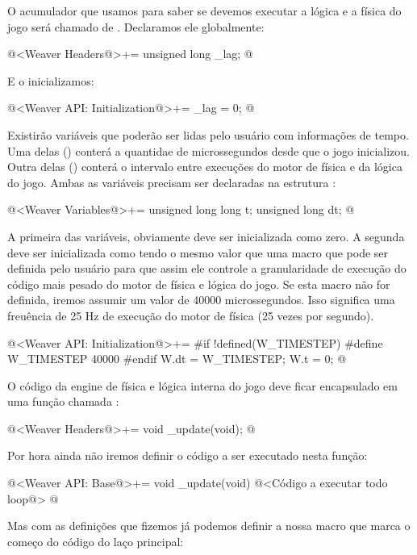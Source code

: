 O acumulador que usamos para saber se devemos executar a lógica e a
física do jogo será chamado de . Declaramos ele
globalmente:

\iniciocodigo
@<Weaver Headers@>+=
unsigned long _lag;
@
\fimcodigo

E o inicializamos:

@<Weaver API: Initialization@>+=
_lag = 0;
@

Existirão variáveis que poderão ser lidas pelo usuário com informações
de tempo. Uma delas () conterá a quantidae de
microssegundos desde que o jogo inicializou. Outra delas
() conterá o intervalo entre execuções do motor de
física e da lógica do jogo. Ambas as variáveis precisam ser declaradas
na estrutura :

\iniciocodigo
@<Weaver Variables@>+=
unsigned long long t;
unsigned long dt;
@
\fimcodigo

A primeira das variáveis, obviamente deve ser inicializada como
zero. A segunda deve ser inicializada como tendo o mesmo valor que uma
macro  que pode ser definida pelo usuário para
que assim ele controle a granularidade de execução do código mais
pesado do motor de física e lógica do jogo. Se esta macro não for
definida, iremos assumir um valor de 40000 microssegundos. Isso
significa uma freuência de 25 Hz de execução do motor de física (25
vezes por segundo).

\iniciocodigo
@<Weaver API: Initialization@>+=
#if !defined(W_TIMESTEP)
#define W_TIMESTEP 40000
#endif
W.dt = W_TIMESTEP;
W.t = 0;
@
\fimcodigo

O código da engine de física e lógica interna do jogo deve ficar
encapsulado em uma função chamada :

\iniciocodigo
@<Weaver Headers@>+=
void _update(void);
@
\fimcodigo

Por hora ainda não iremos definir o código a ser executado nesta
função:

\iniciocodigo
@<Weaver API: Base@>+=
void _update(void){
  @<Código a executar todo loop@>
}
@
\fimcodigo

Mas com as definições que fizemos já podemos definir a nossa macro que
marca o começo do código do laço principal:

